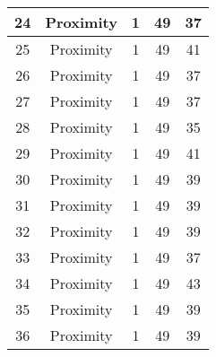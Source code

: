 \documentclass[results.tex]{subfiles}
\begin{document}
\begin{center}
\begin{tabular}{| c || c | c | c | c |}
            \hline
            24                      & Proximity                    & 1                      & 49                      & 37                   \\
            \hline
            25                      & Proximity                    & 1                      & 49                      & 41                   \\
            \hline
            26                      & Proximity                    & 1                      & 49                      & 37                   \\
            \hline
            27                      & Proximity                    & 1                      & 49                      & 37                   \\
            \hline
            28                      & Proximity                    & 1                      & 49                      & 35                   \\
            \hline
            29                      & Proximity                    & 1                      & 49                      & 41                   \\
            \hline
            30                      & Proximity                    & 1                      & 49                      & 39                   \\
            \hline
            31                      & Proximity                    & 1                      & 49                      & 39                   \\
            \hline
            32                      & Proximity                    & 1                      & 49                      & 39                   \\
            \hline
            33                      & Proximity                    & 1                      & 49                      & 37                   \\
            \hline
            34                      & Proximity                    & 1                      & 49                      & 43                   \\
            \hline
            35                      & Proximity                    & 1                      & 49                      & 39                   \\
            \hline
            36                      & Proximity                    & 1                      & 49                      & 39                   \\

\end{tabular}
\end{center}
\end{document}
